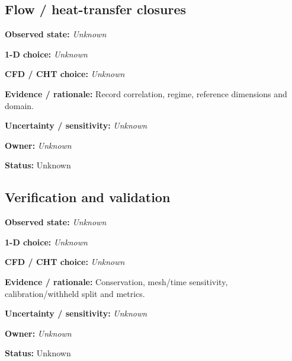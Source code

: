 \documentclass[11pt]{article}
\begin{document}
\par\noindent\begin{minipage}{\textwidth}\small\setlength{\parskip}{2pt}
\subsection*{Flow / heat-transfer closures}
\textbf{Observed state:} \textit{Unknown}\par
\textbf{1-D choice:} \textit{Unknown}\par
\textbf{CFD / CHT choice:} \textit{Unknown}\par
\textbf{Evidence / rationale:} Record correlation, regime, reference dimensions and domain.\par
\textbf{Uncertainty / sensitivity:} \textit{Unknown}\par
\textbf{Owner:} \textit{Unknown}\par
\textbf{Status:} Unknown\par
\end{minipage}\par\vspace{5pt}
\par\noindent\begin{minipage}{\textwidth}\small\setlength{\parskip}{2pt}
\subsection*{Verification and validation}
\textbf{Observed state:} \textit{Unknown}\par
\textbf{1-D choice:} \textit{Unknown}\par
\textbf{CFD / CHT choice:} \textit{Unknown}\par
\textbf{Evidence / rationale:} Conservation, mesh/time sensitivity, calibration/withheld split and metrics.\par
\textbf{Uncertainty / sensitivity:} \textit{Unknown}\par
\textbf{Owner:} \textit{Unknown}\par
\textbf{Status:} Unknown\par
\end{minipage}\par\vspace{5pt}
\end{document}
